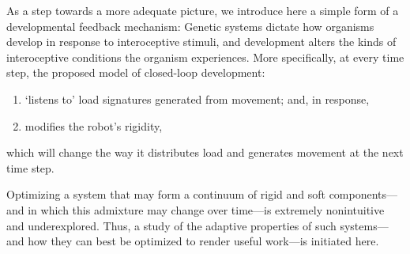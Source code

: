 As a step towards a more adequate picture, we introduce here a simple form of a developmental feedback mechanism:
Genetic systems dictate how organisms develop in response to interoceptive stimuli, and development alters the kinds of interoceptive conditions the organism experiences.
More specifically, at every time step, the proposed model of closed-loop development:
\begin{enumerate}
\item `listens to' load signatures generated from movement; and, in response,
\item modifies the robot's rigidity,
\end{enumerate}
which will change the way it distributes load and generates movement at the next time step.


Optimizing a system that may form a continuum of rigid and soft components---and in which this admixture may change over time---is extremely nonintuitive and underexplored.
Thus, a study of the adaptive properties of such systems---and how they can best be optimized to render useful work---is initiated here.

